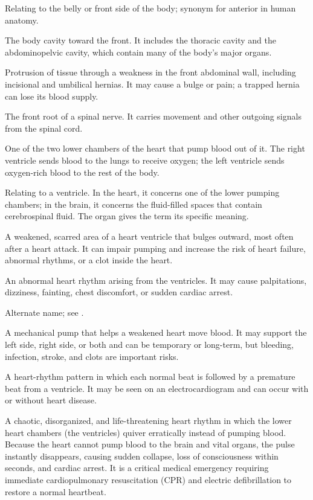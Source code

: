  Relating to the belly or front side of the body; synonym for anterior in human anatomy.

 The body cavity toward the front. It includes the thoracic cavity and the abdominopelvic cavity, which contain many of the body’s major organs.

 Protrusion of tissue through a weakness in the front abdominal wall, including incisional and umbilical hernias. It may cause a bulge or pain; a trapped hernia can lose its blood supply.

 The front root of a spinal nerve. It carries movement and other outgoing signals from the spinal cord.

 One of the two lower chambers of the heart that pump blood out of it. The right ventricle sends blood to the lungs to receive oxygen; the left ventricle sends oxygen-rich blood to the rest of the body.

 Relating to a ventricle. In the heart, it concerns one of the lower pumping chambers; in the brain, it concerns the fluid-filled spaces that contain cerebrospinal fluid. The organ gives the term its specific meaning.

 A weakened, scarred area of a heart ventricle that bulges outward, most often after a heart attack. It can impair pumping and increase the risk of heart failure, abnormal rhythms, or a clot inside the heart.

 An abnormal heart rhythm arising from the ventricles. It may cause palpitations, dizziness, fainting, chest discomfort, or sudden cardiac arrest.

 Alternate name; see .

 A mechanical pump that helps a weakened heart move blood. It may support the left side, right side, or both and can be temporary or long-term, but bleeding, infection, stroke, and clots are important risks.

 A heart-rhythm pattern in which each normal beat is followed by a premature beat from a ventricle. It may be seen on an electrocardiogram and can occur with or without heart disease.

 A chaotic, disorganized, and life-threatening heart rhythm in which the lower heart chambers (the ventricles) quiver erratically instead of pumping blood. Because the heart cannot pump blood to the brain and vital organs, the pulse instantly disappears, causing sudden collapse, loss of consciousness within seconds, and cardiac arrest. It is a critical medical emergency requiring immediate cardiopulmonary resuscitation (CPR) and electric defibrillation to restore a normal heartbeat.

